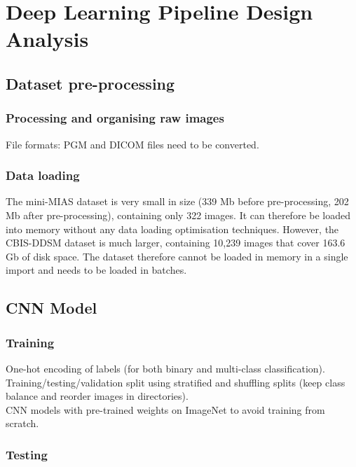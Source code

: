 \section{Deep Learning Pipeline Design Analysis}

\subsection{Dataset pre-processing}

\subsubsection{Processing and organising raw images}

File formats: PGM and DICOM files need to be converted.

\subsubsection{Data loading}

The mini-MIAS dataset is very small in size (339 Mb before pre-processing, 202 Mb after pre-processing), containing only 322 images. It can therefore be loaded into memory without any data loading optimisation techniques. However, the CBIS-DDSM dataset is much larger, containing 10,239 images that cover 163.6 Gb of disk space. The dataset therefore cannot be loaded in memory in a single import and needs to be loaded in batches.\\ %

\subsection{CNN Model}

\subsubsection{Training}

One-hot encoding of labels (for both binary and multi-class classification).\\

Training/testing/validation split using stratified and shuffling splits (keep class balance and reorder images in directories).\\

CNN models with pre-trained weights on ImageNet to avoid training from scratch.

\subsubsection{Testing}

